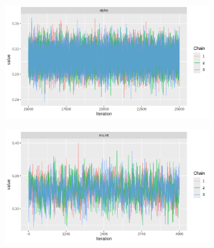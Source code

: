\documentclass[12pt]{article}
\begin{document}
\begin{figure}[h!]
    \centering
    \begin{subfigure}{0.45\textwidth}
        \includegraphics[width=\linewidth]{pictures/centered/centtracealpha.png}
    \end{subfigure}
    \begin{subfigure}{0.45\textwidth}
        \includegraphics[width=\linewidth]{pictures/mod2/mod2trace_muint.png}
    \end{subfigure}


\end{figure}
\end{document}
